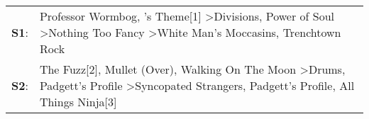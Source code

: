 \begin{supertabular}{p{0.03\textwidth}p{0.92\textwidth}}
 \textbf{S1}:  &                                   Professor Wormbog\textsuperscript{}, 's Theme[1]\textsuperscript{} \textgreater \enspace Divisions\textsuperscript{}, \enspace Power of Soul\textsuperscript{} \textgreater \enspace Nothing Too Fancy\textsuperscript{} \textgreater \enspace White Man's Moccasins\textsuperscript{}, \enspace Trenchtown Rock\textsuperscript{}  \enspace  \\
 \textbf{S2}:  &  The Fuzz[2]\textsuperscript{}, \enspace Mullet (Over)\textsuperscript{}, \enspace Walking On The Moon\textsuperscript{} \textgreater \enspace Drums\textsuperscript{}, \enspace Padgett's Profile\textsuperscript{} \textgreater \enspace Syncopated Strangers\textsuperscript{}, \enspace Padgett's Profile\textsuperscript{}, \enspace All Things Ninja[3]\textsuperscript{}  \enspace  \\
\end{supertabular}
